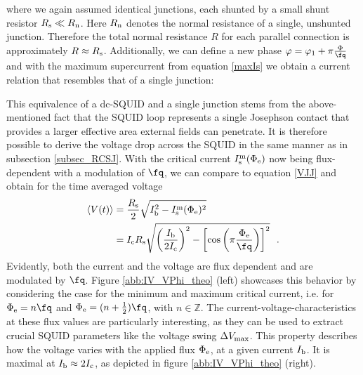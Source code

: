 
where we again assumed identical junctions, each shunted by a small shunt resistor $R_{\rm s}\ll R_{\rm n}$. Here $R_{\rm n}$ denotes the normal resistance of a single, unshunted junction. Therefore the total normal resistance $R$ for each parallel connection is approximately $R\approx R_{\rm s}$. Additionally, we can define a new phase $\varphi=\varphi_1 + \pi\frac{\Phi}{\unit{\fq}}$ and with the maximum supercurrent from equation \ref{maxIs} we obtain a current relation that resembles that of a single junction:


This equivalence of a dc-SQUID and a single junction stems from the above-mentioned fact that the SQUID loop represents a single Josephson contact that provides a larger effective area external fields can penetrate. It is therefore possible to derive the voltage drop across the SQUID in the same manner as in subsection \ref{subsec_RCSJ}. With the critical current $I_{\rm s}^{\rm m}(\Phi_{\rm e})$ now being flux-dependent with a modulation of $\unit{\fq}$, we can compare to equation \ref{VJJ} and obtain for the time averaged voltage \cite{Clarke2004}
\begin{align}\label{squidV(t)}
	\langle V(t)\rangle &= \frac{R_{\rm s}}{2}\sqrt{I_{\rm b}^2 - I_{\rm s}^{\rm m}(\Phi_{\rm e})^2} \\ &= I_{\rm c}R_{\rm s}\sqrt{\left(\frac{I_{\rm b}}{2I_{\rm c}}\right)^2-\left[\cos\left(\pi\frac{\Phi_{\rm e}}{\unit{\fq}}\right)\right]^2} \ \ .	
\end{align}     
Evidently, both the current and the voltage are flux dependent and are modulated by $\unit{\fq}$. Figure \ref{abb:IV_VPhi_theo} (left) showcases this behavior by considering the case for the minimum and maximum critical current, i.e. for $\Phi_{\rm e} = n\unit{\fq}$ and $\Phi_{\rm e} = (n+\frac{1}{2})\unit{\fq}$, with $n\in\mathbb{Z}$. The current-voltage-characteristics at these flux values are particularly interesting, as they can be used to extract crucial SQUID parameters like the voltage swing $\Delta V_{\rm max}$. This property describes how the voltage varies with the applied flux $\Phi_{\rm e}$, at a given current $I_{\rm b}$. It is maximal at $I_{\rm b}\approx 2I_{\rm c}$, as depicted in figure \ref{abb:IV_VPhi_theo} (right). \\

